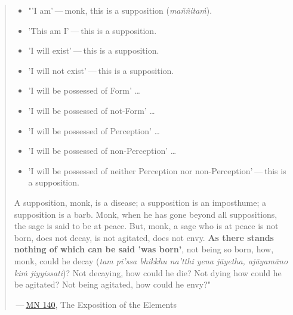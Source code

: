 \begin{quotation}
\begin{itemize}

\item "'I am' — monk, this is a supposition (\emph{maññitaṁ}).

\item 'This am I' — this is a supposition.

\item 'I will exist' — this is a supposition.

\item 'I will not exist' — this is a supposition.

\item 'I will be possessed of Form' …​

\item 'I will be possessed of not-Form' …​

\item 'I will be possessed of Perception' …​

\item 'I will be possessed of non-Perception' …​

\item 'I will be possessed of neither Perception nor non-Perception' — this is a supposition.

\end{itemize}


A supposition, monk, is a disease; a supposition is an
imposthume; a supposition is a barb. Monk, when he has gone beyond all
suppositions, the sage is said to be at peace. But, monk, a sage who is
at peace is not born, does not decay, is not agitated, does not envy.
\textbf{As there stands nothing of which can be said 'was born'}, not being
so born, how, monk, could he decay (\emph{tam pi’ssa bhikkhu na’tthi yena
jāyetha, ajāyamāno kiṁ jiyyissati})? Not decaying, how could he die?
Not dying how could he be agitated? Not being agitated, how could he envy?"


 — \href{https://suttacentral.net/mn140/en/bodhi}{MN 140}, The Exposition of the Elements


\end{quotation}

